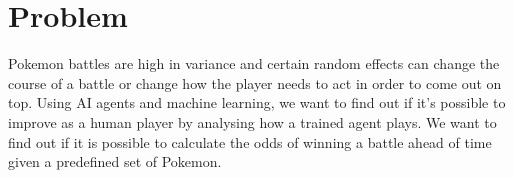 \section{Problem}
\label{sec:problem-description}

Pokemon battles are high in variance and certain random effects can change
the course of a battle or change how the player needs to act in order to
come out on top. Using AI agents and machine learning, we want to find out
if it's possible to improve as a human player by analysing how a trained
agent plays. We want to find out if it is possible to calculate the odds 
of winning a battle ahead of time given a predefined set of Pokemon.
